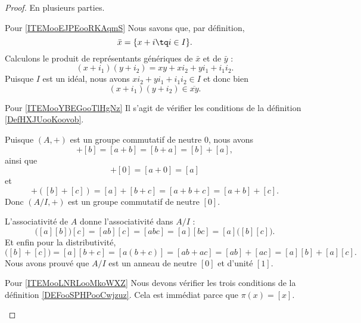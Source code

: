 \begin{proof}
    En plusieurs parties.
    \begin{subproof}
        \item[Pour \ref{ITEMooEJPEooRKAqmS}]
            Nous savons que, par définition,
            \begin{equation}
                \bar x=\{ x+i\tq i\in I \}.
            \end{equation}
            Calculons le produit de représentants génériques de \( \bar x\) et de \( \bar y\) :
            \begin{equation}
                (x+i_1)(y+i_2)=xy+xi_2+yi_1+i_1i_2.
            \end{equation}
            Puisque \( I\) est un idéal, nous avons \( xi_2+yi_1+i_1i_2\in I\) et donc bien
            \begin{equation}
                (x+i_1)(y+i_2)\in \overline{ xy }.
            \end{equation}
        \item[Pour \ref{ITEMooYBEGooTlHgNz}]
            Il s'agit de vérifier les conditions de la définition \ref{DefHXJUooKoovob}.

            Puisque \( (A,+)\) est un groupe commutatif de neutre \( 0\), nous avons
            \begin{equation}
                [a]+[b]=[a+b]=[b+a]=[b]+[a],
            \end{equation}
            ainsi que
            \begin{equation}
                [a]+[0]=[a+0]=[a]
            \end{equation}
            et
            \begin{equation}
                [a]+([b]+[c])=[a]+[b+c]=[a+b+c]=[a+b]+[c].
            \end{equation}
            Donc \( (A/I,+)\) est un groupe commutatif de neutre \( [0]\).

            L'associativité de \( A\) donne l'associativité dans \( A/I\) :
            \begin{equation}
                \big( [a][b] \big)[c]=[ab][c]=[abc]=[a][bc]=[a]\big( [b][c] \big).
            \end{equation}
            Et enfin pour la distributivité,
            \begin{equation}
                [a]\big( [b]+[c] \big)=[a][b+c]=[a(b+c)]=[ab+ac]=[ab]+[ac]=[a][b]+[a][c].
            \end{equation}
            Nous avons prouvé que \( A/I\) est un anneau de neutre \( [0]\) et d'unité \( [1]\).
        \item[Pour \ref{ITEMooLNRLooMkoWXZ}]
            Nous devons vérifier les trois conditions de la définition \ref{DEFooSPHPooCwjzuz}. Cela est immédiat parce que \( \pi(x)=[x]\).
    \end{subproof}
\end{proof}


